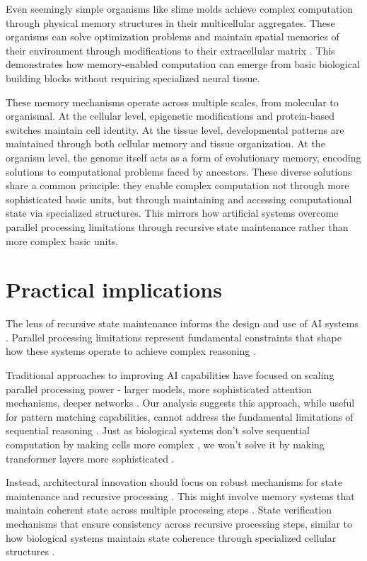 \documentclass[12pt]{article}
\begin{document}
Even seemingly simple organisms like slime molds achieve complex computation through physical memory structures in their multicellular aggregates. These organisms can solve optimization problems and maintain spatial memories of their environment through modifications to their extracellular matrix \cite{hoel2020emergence}. This demonstrates how memory-enabled computation can emerge from basic biological building blocks without requiring specialized neural tissue.

These memory mechanisms operate across multiple scales, from molecular to organismal. At the cellular level, epigenetic modifications and protein-based switches maintain cell identity. At the tissue level, developmental patterns are maintained through both cellular memory and tissue organization. At the organism level, the genome itself acts as a form of evolutionary memory, encoding solutions to computational problems faced by ancestors. These diverse solutions share a common principle: they enable complex computation not through more sophisticated basic units, but through maintaining and accessing computational state via specialized structures. This mirrors how artificial systems overcome parallel processing limitations through recursive state maintenance rather than more complex basic units.

\section{Practical implications}

The lens of recursive state maintenance informs the design and use of AI systems \cite{dickson2024trust,ahn2024recursive}. Parallel processing limitations represent fundamental constraints that shape how these systems operate to achieve complex reasoning \cite{merrill2023parallelism}.

Traditional approaches to improving AI capabilities have focused on scaling parallel processing power - larger models, more sophisticated attention mechanisms, deeper networks \cite{shallue2019measuring}. Our analysis suggests this approach, while useful for pattern matching capabilities, cannot address the fundamental limitations of sequential reasoning \cite{peng2024limitations}. Just as biological systems don't solve sequential computation by making cells more complex \cite{wang2023parallel}, we won't solve it by making transformer layers more sophisticated \cite{zhao2024epha}.

Instead, architectural innovation should focus on robust mechanisms for state maintenance and recursive processing \cite{jung2020new}. This might involve memory systems that maintain coherent state across multiple processing steps \cite{zhu2024overcoming}. State verification mechanisms that ensure consistency across recursive processing steps, similar to how biological systems maintain state coherence through specialized cellular structures \cite{espinosa2024molecular}.
\end{document}
